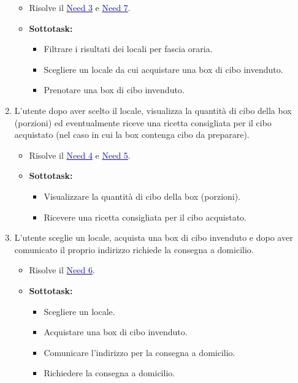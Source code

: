 \documentclass{article}
\begin{document}
\begin{enumerate}[label=\textbf{Task-\arabic*}]
    \begin{itemize}
        \item Risolve il \hyperref[need3]{\textcolor{blue}{Need 3}} e \hyperref[need7]{\textcolor{blue}{Need 7}}.
        \item \textbf{Sottotask:} 
        \begin{itemize}
            \item Filtrare i risultati dei locali per fascia oraria.
            \item Scegliere un locale da cui acquistare una box di cibo invenduto.
            \item Prenotare una box di cibo invenduto.
        \end{itemize}
    \end{itemize}
    \item L'utente dopo aver scelto il locale, visualizza la quantità di cibo della box (porzioni) ed eventualmente riceve una ricetta consigliata per il cibo acquistato (nel caso in cui la box contenga cibo da preparare).
    \begin{itemize}
        \item Risolve il \hyperref[need4]{\textcolor{blue}{Need 4}} e \hyperref[need5]{\textcolor{blue}{Need 5}}.
        \item \textbf{Sottotask:} 
        \begin{itemize}
            \item Visualizzare la quantità di cibo della box (porzioni).
            \item Ricevere una ricetta consigliata per il cibo acquistato.
        \end{itemize}
    \end{itemize}
    \item L'utente sceglie un locale, acquista una box di cibo invenduto e dopo aver comunicato il proprio indirizzo richiede la consegna a domicilio.
    \begin{itemize}
        \item Risolve il \hyperref[need6]{\textcolor{blue}{Need 6}}.
        \item \textbf{Sottotask:} 
        \begin{itemize}
            \item Scegliere un locale.
            \item Acquistare una box di cibo invenduto.
            \item Comunicare l'indirizzo per la consegna a domicilio.
            \item Richiedere la consegna a domicilio.

\end{itemize}
\end{itemize}
\end{enumerate}
\end{document}
